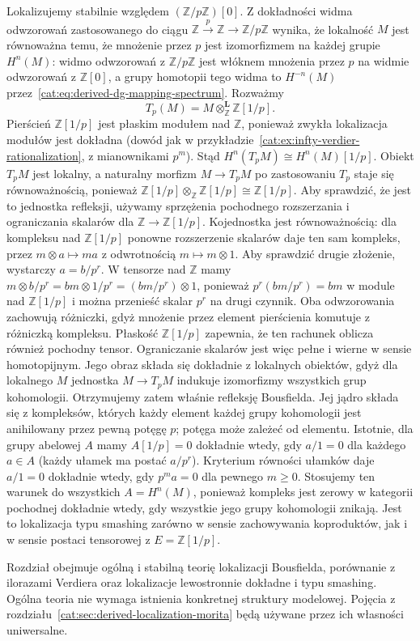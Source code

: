 \begin{przyklad}
Lokalizujemy stabilnie względem $(\mathbb Z/p\mathbb Z)[0]$. Z dokładności widma odwzorowań zastosowanego do ciągu $\mathbb Z\xrightarrow{p}\mathbb Z\to\mathbb Z/p\mathbb Z$ wynika, że lokalność $M$ jest równoważna temu, że mnożenie przez $p$ jest izomorfizmem na każdej grupie $H^n(M)$: widmo odwzorowań z $\mathbb Z/p\mathbb Z$ jest włóknem mnożenia przez $p$ na widmie odwzorowań z $\mathbb Z[0]$, a grupy homotopii tego widma to $H^{-n}(M)$ przez~\eqref{cat:eq:derived-dg-mapping-spectrum}. Rozważmy
\[
 T_p(M)=M\otimes_{\mathbb Z}^{\mathbf L}\mathbb Z[1/p].
\]
Pierścień $\mathbb Z[1/p]$ jest płaskim modułem nad $\mathbb Z$, ponieważ zwykła lokalizacja modułów jest dokładna (dowód jak w przykładzie~\ref{cat:ex:infty-verdier-rationalization}, z mianownikami $p^m$). Stąd $H^n(T_p M)\cong H^n(M)[1/p]$. Obiekt $T_pM$ jest lokalny, a naturalny morfizm $M\to T_pM$ po zastosowaniu $T_p$ staje się równoważnością, ponieważ $\mathbb Z[1/p]\otimes_{\mathbb Z}\mathbb Z[1/p]\cong\mathbb Z[1/p]$. Aby sprawdzić, że jest to jednostka refleksji, używamy sprzężenia pochodnego rozszerzania i ograniczania skalarów dla $\mathbb Z\to\mathbb Z[1/p]$. Kojednostka jest równoważnością: dla kompleksu nad $\mathbb Z[1/p]$ ponowne rozszerzenie skalarów daje ten sam kompleks, przez $m\otimes a\mapsto ma$ z odwrotnością $m\mapsto m\otimes1$. Aby sprawdzić drugie złożenie, wystarczy $a=b/p^r$. W tensorze nad $\mathbb Z$ mamy $m\otimes b/p^r=bm\otimes1/p^r=(bm/p^r)\otimes1$, ponieważ $p^r(bm/p^r)=bm$ w module nad $\mathbb Z[1/p]$ i można przenieść skalar $p^r$ na drugi czynnik. Oba odwzorowania zachowują różniczki, gdyż mnożenie przez element pierścienia komutuje z różniczką kompleksu. Płaskość $\mathbb Z[1/p]$ zapewnia, że ten rachunek oblicza również pochodny tensor. Ograniczanie skalarów jest więc pełne i wierne w sensie homotopijnym. Jego obraz składa się dokładnie z lokalnych obiektów, gdyż dla lokalnego $M$ jednostka $M\to T_pM$ indukuje izomorfizmy wszystkich grup kohomologii. Otrzymujemy zatem właśnie refleksję Bousfielda. Jej jądro składa się z kompleksów, których każdy element każdej grupy kohomologii jest anihilowany przez pewną potęgę $p$; potęga może zależeć od elementu. Istotnie, dla grupy abelowej $A$ mamy $A[1/p]=0$ dokładnie wtedy, gdy $a/1=0$ dla każdego $a\in A$ (każdy ułamek ma postać $a/p^r$). Kryterium równości ułamków daje $a/1=0$ dokładnie wtedy, gdy $p^m a=0$ dla pewnego $m\geq0$. Stosujemy ten warunek do wszystkich $A=H^n(M)$, ponieważ kompleks jest zerowy w kategorii pochodnej dokładnie wtedy, gdy wszystkie jego grupy kohomologii znikają. Jest to lokalizacja typu smashing zarówno w sensie zachowywania koproduktów, jak i w sensie postaci tensorowej z $E=\mathbb Z[1/p]$.
\end{przyklad}

\begin{uwaga}\label{cat:rem:infty-presentable-scope}
Rozdział obejmuje ogólną i stabilną teorię lokalizacji Bousfielda, porównanie z ilorazami Verdiera oraz lokalizacje lewostronnie dokładne i typu smashing. Ogólna teoria nie wymaga istnienia konkretnej struktury modelowej. Pojęcia z rozdziału~\ref{cat:sec:derived-localization-morita} będą używane przez ich własności uniwersalne.
\end{uwaga}
